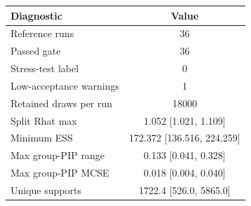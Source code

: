 \begin{tabular}{lc}
\toprule
Diagnostic & Value \\
\midrule
Reference runs & 36 \\
Passed gate & 36 \\
Stress-test label & 0 \\
Low-acceptance warnings & 1 \\
Retained draws per run & 18000 \\
Split Rhat max & 1.052 [1.021, 1.109] \\
Minimum ESS & 172.372 [136.516, 224.259] \\
Max group-PIP range & 0.133 [0.041, 0.328] \\
Max group-PIP MCSE & 0.018 [0.004, 0.040] \\
Unique supports & 1722.4 [526.0, 5865.0] \\
\bottomrule
\end{tabular}
